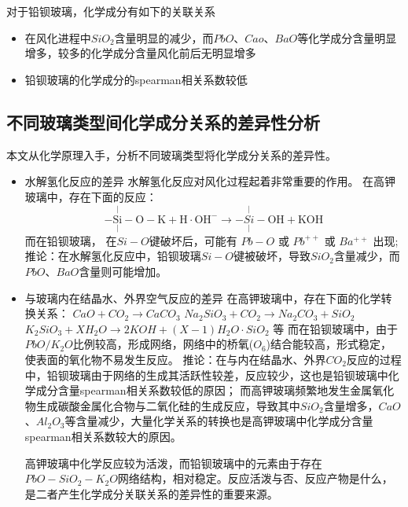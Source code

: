 \documentclass[withoutpreface,bwprint]{cumcmthesis} %
\begin{document}
对于铅钡玻璃，化学成分有如下的关联关系
\begin{itemize}
	\item 在风化进程中$SiO_{2}$含量明显的减少，而$PbO$、$Cao$、$BaO$等化学成分含量明显增多，较多的化学成分含量风化前后无明显增多
	\item 铅钡玻璃的化学成分的spearman相关系数较低
\end{itemize}

\subsection{不同玻璃类型间化学成分关系的差异性分析}

本文从化学原理入手，分析不同玻璃类型将化学成分关系的差异性。

\begin{itemize}

\item 

水解氢化反应的差异 
水解氢化反应对风化过程起着非常重要的作用。 在高钾玻璃中，存在下面的反应： $$-\underset{|} {\mathrm{\overset{|}{Si}}}-\mathrm{O}-\mathrm{K}+\mathrm{H} \cdot \mathrm{OH}^{-} \rightarrow-\underset{|}{\overset{|}{Si}}-\mathrm{OH}+\mathrm{KOH}$$ 而在铅钡玻璃， 在$Si-O$键破坏后，可能有 $Pb-O$ 或 $Pb^{++}$ 或 $Ba^{++}$ 出现; 
推论：在水解氢化反应中，铅钡玻璃$Si-O$键被破坏，导致$SiO_{2}$含量减少，而$PbO$、$BaO$含量则可能增加。

\item 
与玻璃内在结晶水、外界空气反应的差异 
在高钾玻璃中，存在下面的化学转换关系： $CaO+CO_{2} \rightarrow CaCO_{3}$ $Na_{2}SiO_{3} + CO_{2} \rightarrow Na_{2}CO_{3}+SiO_{2}$ $K_{2}SiO_{3}+XH_{2}O \rightarrow 2KOH + (X-1)H_{2}O \cdot SiO_{2}$
等 而在铅钡玻璃中，由于$PbO/K_{2}O$比例较高，形成网络，网络中的桥氧($O_{6}$)结合能较高，形式稳定，使表面的氧化物不易发生反应。 推论：在与内在结晶水、外界$CO_{2}$反应的过程中，铅钡玻璃由于网络的生成其活跃性较差，反应较少，这也是铅钡玻璃中化学成分含量spearman相关系数较低的原因； 而高钾玻璃频繁地发生金属氧化物生成碳酸金属化合物与二氧化硅的生成反应，导致其中$SiO_{2}$含量增多，$CaO$、$Al_{2}O_{3}$等含量减少，大量化学关系的转换也是高钾玻璃中化学成分含量spearman相关系数较大的原因。


高钾玻璃中化学反应较为活泼，而铅钡玻璃中的元素由于存在$PbO-SiO_{2}-K_{2}O$网络结构，相对稳定。反应活泼与否、反应产物是什么，是二者产生化学成分关联关系的差异性的重要来源。

\end{itemize}
\end{document}
